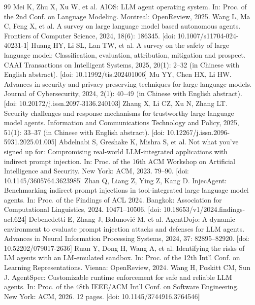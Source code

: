 {\small
\begin{thebibliography}{99}
 Mei K, Zhu X, Xu W, et al. AIOS: LLM agent operating system. In: Proc. of the 2nd Conf. on Language Modeling. Montreal: OpenReview, 2025.
 Wang L, Ma C, Feng X, et al. A survey on large language model based autonomous agents. Frontiers of Computer Science, 2024, 18(6): 186345. [doi: 10.1007/s11704-024-40231-1]
 Huang HY, Li SL, Lan TW, et al. A survey on the safety of large language model: Classification, evaluation, attribution, mitigation and prospect. CAAI Transactions on Intelligent Systems, 2025, 20(1): 2--32 (in Chinese with English abstract). [doi: 10.11992/tis.202401006]
 Mu YY, Chen HX, Li HW. Advances in security and privacy-preserving techniques for large language models. Journal of Cybersecurity, 2024, 2(1): 40--49 (in Chinese with English abstract). [doi: 10.20172/j.issn.2097-3136.240103]
 Zhang X, Li CZ, Xu N, Zhang LT. Security challenges and response mechanisms for trustworthy large language model agents. Information and Communications Technology and Policy, 2025, 51(1): 33--37 (in Chinese with English abstract). [doi: 10.12267/j.issn.2096-5931.2025.01.005]
 Abdelnabi S, Greshake K, Mishra S, et al. Not what you've signed up for: Compromising real-world LLM-integrated applications with indirect prompt injection. In: Proc. of the 16th ACM Workshop on Artificial Intelligence and Security. New York: ACM, 2023. 79--90. [doi: 10.1145/3605764.3623985]
 Zhan Q, Liang Z, Ying Z, Kang D. InjecAgent: Benchmarking indirect prompt injections in tool-integrated large language model agents. In: Proc. of the Findings of ACL 2024. Bangkok: Association for Computational Linguistics, 2024. 10471--10506. [doi: 10.18653/v1/2024.findings-acl.624]
 Debenedetti E, Zhang J, Balunovi\'{c} M, et al. AgentDojo: A dynamic environment to evaluate prompt injection attacks and defenses for LLM agents. Advances in Neural Information Processing Systems, 2024, 37: 82895--82920. [doi: 10.52202/079017-2636]
 Ruan Y, Dong H, Wang A, et al. Identifying the risks of LM agents with an LM-emulated sandbox. In: Proc. of the 12th Int'l Conf. on Learning Representations. Vienna: OpenReview, 2024.
 Wang H, Poskitt CM, Sun J. AgentSpec: Customizable runtime enforcement for safe and reliable LLM agents. In: Proc. of the 48th IEEE/ACM Int'l Conf. on Software Engineering. New York: ACM, 2026. 12 pages. [doi: 10.1145/3744916.3764546]

\end{thebibliography}}
